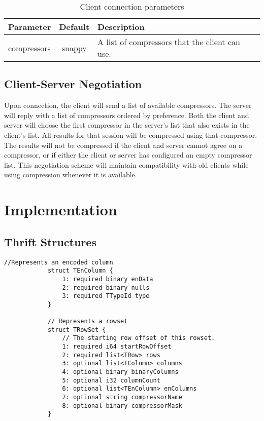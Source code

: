 \documentclass[11pt,a4paper]{article}
\begin{document}
		\begin{table}[H]
			\begin{tabular}{| p{3cm} | c | p{6.5cm} |} \hline
				\textbf{Parameter} & \textbf{Default} & \textbf{Description} \\ \hline
				compressors
				& snappy & A list of compressors that the client can use. 
				\\ \hline
			\end{tabular}
			\caption{Client connection parameters}
		\end{table}
		
		\subsection{Client-Server Negotiation}
		Upon connection, the client will send a list of available compressors. The server will reply with a list of compressors ordered by preference.
		Both the client and server will choose the first compressor in the server's list that also exists in the client's list.
		All results for that session will be compressed using that compressor.
		The results will not be compressed if the client and server cannot agree on a compressor, or if either the client or server has configured an empty compressor list.
		This negotiation scheme will maintain compatibility with old clients while using compression whenever it is available.
		
\section{Implementation}
	
	\subsection{Thrift Structures}
		
		\begin{lstlisting}[title=TCLIService.thrift,gobble=6,otherkeywords={binary,i32,i64,string,struct,TColumn,TEnColumn,TRow,TRowSet,TTypeId}]
			//Represents an encoded column
			struct TEnColumn {
				1: required binary enData
				2: required binary nulls
				3: required TTypeId type
			}
			
			// Represents a rowset
			struct TRowSet {
				// The starting row offset of this rowset.
				1: required i64 startRowOffset
				2: required list<TRow> rows
				3: optional list<TColumn> columns
				4: optional binary binaryColumns
				5: optional i32 columnCount
				6: optional list<TEnColumn> enColumns
				7: optional string compressorName
				8: optional binary compressorMask
			}
		\end{lstlisting}
		
\end{document}
